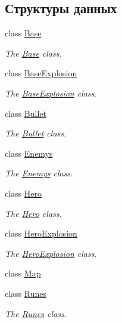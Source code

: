 \subsection*{Структуры данных}
\begin{DoxyCompactItemize}
\item 
class \hyperlink{classGameObject_1_1Base}{Base}
\begin{DoxyCompactList}\small\item\em The \hyperlink{classGameObject_1_1Base}{Base} class. \end{DoxyCompactList}\item 
class \hyperlink{classGameObject_1_1BaseExplosion}{Base\+Explosion}
\begin{DoxyCompactList}\small\item\em The \hyperlink{classGameObject_1_1BaseExplosion}{Base\+Explosion} class. \end{DoxyCompactList}\item 
class \hyperlink{classGameObject_1_1Bullet}{Bullet}
\begin{DoxyCompactList}\small\item\em The \hyperlink{classGameObject_1_1Bullet}{Bullet} class. \end{DoxyCompactList}\item 
class \hyperlink{classGameObject_1_1Enemys}{Enemys}
\begin{DoxyCompactList}\small\item\em The \hyperlink{classGameObject_1_1Enemys}{Enemys} class. \end{DoxyCompactList}\item 
class \hyperlink{classGameObject_1_1Hero}{Hero}
\begin{DoxyCompactList}\small\item\em The \hyperlink{classGameObject_1_1Hero}{Hero} class. \end{DoxyCompactList}\item 
class \hyperlink{classGameObject_1_1HeroExplosion}{Hero\+Explosion}
\begin{DoxyCompactList}\small\item\em The \hyperlink{classGameObject_1_1HeroExplosion}{Hero\+Explosion} class. \end{DoxyCompactList}\item 
class \hyperlink{classGameObject_1_1Map}{Map}
\item 
class \hyperlink{classGameObject_1_1Runes}{Runes}
\begin{DoxyCompactList}\small\item\em The \hyperlink{classGameObject_1_1Runes}{Runes} class. \end{DoxyCompactList}\end{DoxyCompactItemize}
